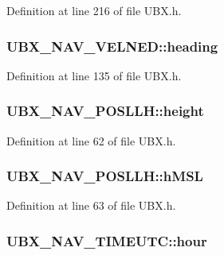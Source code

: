 Definition at line 216 of file U\-B\-X.\-h.

\hypertarget{group___g_s_p_module_ga1e0129270ba7fdbba7e441e60cefa8a7}{
\subsubsection[{heading}]{ U\-B\-X\-\_\-\-N\-A\-V\-\_\-\-V\-E\-L\-N\-E\-D\-::heading}}\label{group___g_s_p_module_ga1e0129270ba7fdbba7e441e60cefa8a7}


Definition at line 135 of file U\-B\-X.\-h.

\hypertarget{group___g_s_p_module_gacb639227d81a2413277fb492f6b450a0}{
\subsubsection[{height}]{ U\-B\-X\-\_\-\-N\-A\-V\-\_\-\-P\-O\-S\-L\-L\-H\-::height}}\label{group___g_s_p_module_gacb639227d81a2413277fb492f6b450a0}


Definition at line 62 of file U\-B\-X.\-h.

\hypertarget{group___g_s_p_module_gaf78fd4a28f1595624f28d0df15bfcfac}{
\subsubsection[{h\-M\-S\-L}]{ U\-B\-X\-\_\-\-N\-A\-V\-\_\-\-P\-O\-S\-L\-L\-H\-::h\-M\-S\-L}}\label{group___g_s_p_module_gaf78fd4a28f1595624f28d0df15bfcfac}


Definition at line 63 of file U\-B\-X.\-h.

\hypertarget{group___g_s_p_module_ga6685b128ba202f68bbba28ce3877d496}{
\subsubsection[{hour}]{ U\-B\-X\-\_\-\-N\-A\-V\-\_\-\-T\-I\-M\-E\-U\-T\-C\-::hour}}\label{group___g_s_p_module_ga6685b128ba202f68bbba28ce3877d496}


